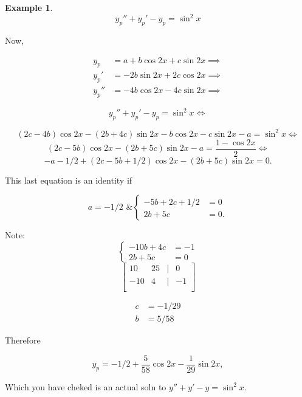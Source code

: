 \documentclass[12pt,a4paper]{article}
\theoremstyle{definition}
\newtheorem*{example}{Example}
\begin{document}
\begin{example}
  \[ y_p'' + y_p' - y_p = \sin^2x \]

  Now, 

  \begin{align*}
    y_p &= a + b\cos 2x + c \sin 2x \implies \\
    y_p' &= -2b\sin2x + 2c\cos2x \implies \\
    y_p'' &= -4b\cos2x -4c\sin2x \implies
  \end{align*}

  \[ y_p'' + y_p' - y_p = \sin^2x \iff \]

  \[ (2c-4b)\cos2x - (2b+4c)\sin2x - b\cos2x -c\sin2x -a = \sin^2x \iff \]
  \[ (2c-5b)\cos2x - (2b+5c)\sin2x -a = \frac{1-\cos2x}{2} \iff \]
  \[ -a-1/2+(2c-5b+1/2)\cos2x - (2b+5c)\sin2x = 0. \]

  This last equation is an identity if 

  \[ a = -1/2 \text{ \& } 
  \begin{cases}
    -5b + 2c + 1/2 &= 0 \\
    2b + 5c &=0.
  \end{cases}
  \]

  Note:
  \[
  \begin{cases}
    -10b + 4c &= -1 \\
    2b + 5c &= 0
  \end{cases}
  \]
\[
  \begin{bmatrix}
    10 & 25 & | & 0 \\
    -10 & 4 & | & -1 \\
  \end{bmatrix}
\]

  \begin{align*}
    c &= -1/29 \\
    b &= 5/58
  \end{align*}

  Therefore

  \[ y_p = -1/2 + \frac{5}{58} \cos2x - \frac{1}{29}\sin2x, \]

  Which you have cheked is an actual soln to \( y'' + y' -y = \sin^2x. \)

\end{example}

\end{document}
